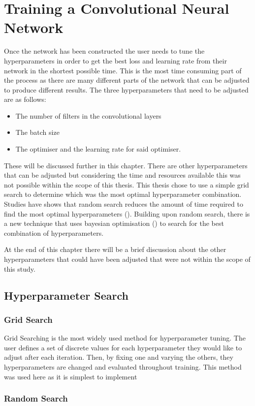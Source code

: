 \chapter{Training a Convolutional Neural Network}
Once the network has been constructed the user needs to tune the hyperparameters in order to get the best loss and learning rate from their network in the shortest possible time. This is the most time consuming part of the process as there are many different parts of the network that can be adjusted to produce different results. The three hyperparameters that need to be adjusted are as follows:
\begin{itemize}
    \item The number of filters in the convolutional layers
    \item The batch size
    \item The optimiser and the learning rate for said optimiser.
\end{itemize}
These will be discussed further in this chapter. There are other hyperparameters that can be adjusted but considering the time and resources available this was not possible within the scope of this thesis. This thesis chose to use a simple grid search to determine which was the most optimal hyperparameter combination. Studies have shows that random search reduces the amount of time required to find the most optimal hyperparameters (\cite{bergstra12}). Building upon random search, there is a new technique that uses bayesian optimisation (\cite{snoek12}) to search for the best combination of hyperparameters.
\par
At the end of this chapter there will be a brief discussion about the other hyperparameters that could have been adjusted that were not within the scope of this study. 
\section{Hyperparameter Search}
\subsection{Grid Search}
Grid Searching is the most widely used method for hyperparameter tuning. The user defines a set of discrete values for each hyperparameter they would like to adjust after each iteration. Then, by fixing one and varying the others, they hyperparameters are changed and evaluated throughout training. This method was used here as it is simplest to implement
\subsection{Random Search}
